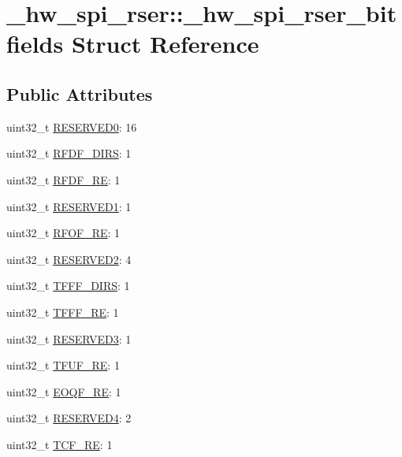 \hypertarget{struct__hw__spi__rser_1_1__hw__spi__rser__bitfields}{}\section{\+\_\+hw\+\_\+spi\+\_\+rser\+:\+:\+\_\+hw\+\_\+spi\+\_\+rser\+\_\+bitfields Struct Reference}
\label{struct__hw__spi__rser_1_1__hw__spi__rser__bitfields}
\subsection*{Public Attributes}
\begin{DoxyCompactItemize}
\item 
uint32\+\_\+t \hyperlink{struct__hw__spi__rser_1_1__hw__spi__rser__bitfields_ad5bcdcae1e72d9e86cf930598608cd32}{R\+E\+S\+E\+R\+V\+E\+D0}\+: 16
\item 
uint32\+\_\+t \hyperlink{struct__hw__spi__rser_1_1__hw__spi__rser__bitfields_a80c72305f415a95a2a7416e4befae1f2}{R\+F\+D\+F\+\_\+\+D\+I\+RS}\+: 1
\item 
uint32\+\_\+t \hyperlink{struct__hw__spi__rser_1_1__hw__spi__rser__bitfields_ac6b03015188fcbf0cef289d983e02365}{R\+F\+D\+F\+\_\+\+RE}\+: 1
\item 
uint32\+\_\+t \hyperlink{struct__hw__spi__rser_1_1__hw__spi__rser__bitfields_a1da96c78ca64ce6398de874438f971f4}{R\+E\+S\+E\+R\+V\+E\+D1}\+: 1
\item 
uint32\+\_\+t \hyperlink{struct__hw__spi__rser_1_1__hw__spi__rser__bitfields_a34201f6b084ce9d8839a1cd0692b31fc}{R\+F\+O\+F\+\_\+\+RE}\+: 1
\item 
uint32\+\_\+t \hyperlink{struct__hw__spi__rser_1_1__hw__spi__rser__bitfields_aff05463253102d5fc4238faeedd07175}{R\+E\+S\+E\+R\+V\+E\+D2}\+: 4
\item 
uint32\+\_\+t \hyperlink{struct__hw__spi__rser_1_1__hw__spi__rser__bitfields_a5c816c096d17d42a68ca5cd10ea39b64}{T\+F\+F\+F\+\_\+\+D\+I\+RS}\+: 1
\item 
uint32\+\_\+t \hyperlink{struct__hw__spi__rser_1_1__hw__spi__rser__bitfields_a45ab5f5d5deccd13483f96aae5b33fe4}{T\+F\+F\+F\+\_\+\+RE}\+: 1
\item 
uint32\+\_\+t \hyperlink{struct__hw__spi__rser_1_1__hw__spi__rser__bitfields_a52a1356c52461060fd8c5df245a61184}{R\+E\+S\+E\+R\+V\+E\+D3}\+: 1
\item 
uint32\+\_\+t \hyperlink{struct__hw__spi__rser_1_1__hw__spi__rser__bitfields_a802155fefd466d9220f546fad5816173}{T\+F\+U\+F\+\_\+\+RE}\+: 1
\item 
uint32\+\_\+t \hyperlink{struct__hw__spi__rser_1_1__hw__spi__rser__bitfields_a1acd7ca10d6d0e683c050c7febcbf3bb}{E\+O\+Q\+F\+\_\+\+RE}\+: 1
\item 
uint32\+\_\+t \hyperlink{struct__hw__spi__rser_1_1__hw__spi__rser__bitfields_a227175e421c63397549fb55cf90c6918}{R\+E\+S\+E\+R\+V\+E\+D4}\+: 2
\item 
uint32\+\_\+t \hyperlink{struct__hw__spi__rser_1_1__hw__spi__rser__bitfields_aa7c820385a08aa6ef0c6298905feba6a}{T\+C\+F\+\_\+\+RE}\+: 1
\end{DoxyCompactItemize}



